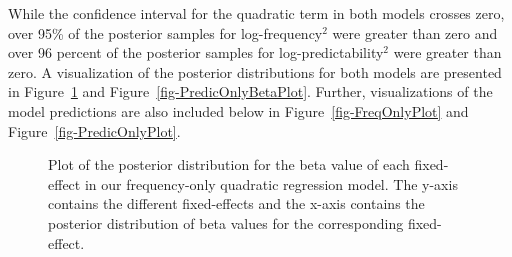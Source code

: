 \documentclass[
  authoryear,
  preprint,
  1p,
  onecolumn]{elsarticle}
\begin{document}
While the confidence interval for the quadratic term in both models
crosses zero, over 95\% of the posterior samples for log-frequency\(^2\)
were greater than zero and over 96 percent of the posterior samples for
log-predictability\(^2\) were greater than zero. A visualization of the
posterior distributions for both models are presented in
Figure~\ref{fig-FreqOnlyBetaPlot} and
Figure~\ref{fig-PredicOnlyBetaPlot}. Further, visualizations of the
model predictions are also included below in
Figure~\ref{fig-FreqOnlyPlot} and Figure~\ref{fig-PredicOnlyPlot}.

\begin{figure}


\caption{\label{fig-FreqOnlyBetaPlot}Plot of the posterior distribution
for the beta value of each fixed-effect in our frequency-only quadratic
regression model. The y-axis contains the different fixed-effects and
the x-axis contains the posterior distribution of beta values for the
corresponding fixed-effect.}

\end{figure}%
\end{document}
